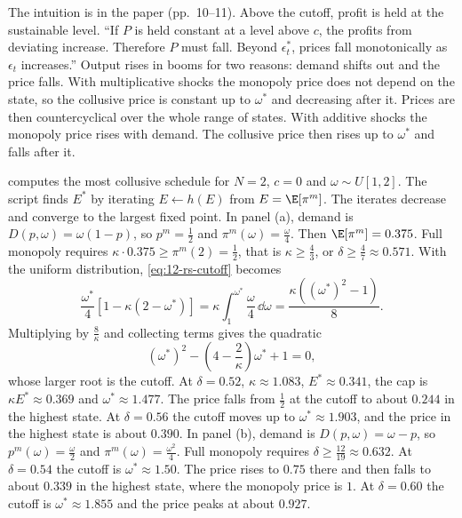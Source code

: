 The intuition is in the paper (pp.~10--11). Above the cutoff, profit is held at the sustainable level. ``If $P$ is
held constant at a level above $c$, the profits from deviating increase. Therefore $P$ must fall. Beyond
$\epsilon_t^*$, prices fall monotonically as $\epsilon_t$ increases.'' Output rises in booms for two reasons:
demand shifts out and the price falls. With multiplicative shocks the monopoly price does not depend on the state, so
the collusive price is constant up to $\omega^*$ and decreasing after it. Prices are then countercyclical over the
whole range of states. With additive shocks the monopoly price rises with demand. The collusive price then rises up
to $\omega^*$ and falls after it.

 computes the most collusive schedule for $N = 2$, $c = 0$ and $\omega \sim U[1,2]$. The script
finds $E^*$ by iterating $E \leftarrow h(E)$ from $E = \E[\pi^m]$. The iterates decrease and converge to the largest
fixed point. In panel (a), demand is $D(p,\omega) = \omega(1-p)$, so $p^m = \frac{1}{2}$ and $\pi^m(\omega) = \frac{\omega}{4}$. Then
$\E[\pi^m] = 0.375$. Full monopoly requires $\kappa \cdot 0.375 \ge \pi^m(2) = \frac{1}{2}$, that is $\kappa \ge \frac{4}{3}$, or
$\delta \ge \frac{4}{7} \approx 0.571$. With the uniform distribution, \eqref{eq:12-rs-cutoff} becomes
\begin{equation*}
\frac{\omega^*}{4}\left[1 - \kappa(2 - \omega^*)\right] = \kappa\int_1^{\omega^*}\frac{\omega}{4}\,\dd\omega = \frac{\kappa\left((\omega^*)^2 - 1\right)}{8}.
\end{equation*}
Multiplying by $\frac{8}{\kappa}$ and collecting terms gives the quadratic
\begin{equation*}
(\omega^*)^2 - \left(4 - \frac{2}{\kappa}\right)\omega^* + 1 = 0,
\end{equation*}
whose larger root is the cutoff. At $\delta = 0.52$, $\kappa \approx 1.083$, $E^* \approx 0.341$, the cap is
$\kappa E^* \approx 0.369$ and $\omega^* \approx 1.477$. The price falls from $\frac{1}{2}$ at the cutoff to about $0.244$
in the highest state. At $\delta = 0.56$ the cutoff moves up to $\omega^* \approx 1.903$, and the price in the highest
state is about $0.390$. In panel (b), demand is $D(p,\omega) = \omega - p$, so $p^m(\omega) = \frac{\omega}{2}$ and
$\pi^m(\omega) = \frac{\omega^2}{4}$. Full monopoly requires $\delta \ge \frac{12}{19} \approx 0.632$. At $\delta = 0.54$ the
cutoff is $\omega^* \approx 1.50$. The price rises to $0.75$ there and then falls to about $0.339$ in the highest state,
where the monopoly price is $1$. At $\delta = 0.60$ the cutoff is $\omega^* \approx 1.855$ and the price peaks at about
$0.927$.

